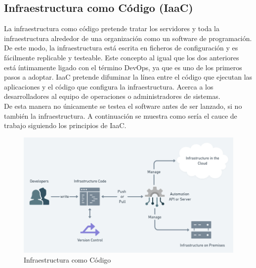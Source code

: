 	\subsection{Infraestructura como Código (IaaC)}
		\begin{text}
			La infraestructura como código pretende tratar los servidores y toda la infraestructura alrededor de una organización como un software de programación. De este modo, la infraestructura está escrita en ficheros de configuración y es fácilmente replicable y testeable. Este concepto al igual que los dos anteriores está íntimamente ligado con el término DevOps, ya que es uno de los primeros pasos a adoptar. IaaC pretende difuminar la línea entre el código que ejecutan las aplicaciones y el código que configura la infraestructura. Acerca a los desarrolladores al equipo de operaciones o administradores de sistemas. \\
			De esta manera no únicamente se testea el software antes de ser lanzado, si no también la infraestructura. A continuación se muestra como sería el cauce de trabajo siguiendo los principios de IaaC.
			
			\begin{figure}[!hbt]
				\centering
				\includegraphics[scale=0.45]{imagenes/Introduccion/Conceptos_Basicos/IaaC.png}
				\caption[Infraestructura como Código]{Infraestructura como Código \cite{WhatIsIaaC:online}}
				\label{infraestructura_como_codigo} 
			\end{figure}
		\end{text}
	
